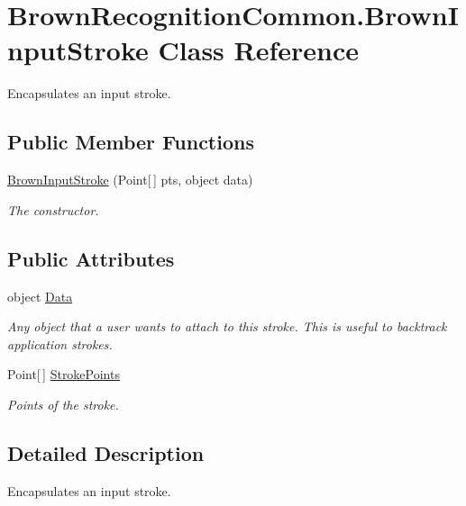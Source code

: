 \hypertarget{class_brown_recognition_common_1_1_brown_input_stroke}{
\section{\-Brown\-Recognition\-Common.\-Brown\-Input\-Stroke \-Class \-Reference}
\label{class_brown_recognition_common_1_1_brown_input_stroke}
}


\-Encapsulates an input stroke.  


\subsection*{\-Public \-Member \-Functions}
\begin{DoxyCompactItemize}
\item 
\hyperlink{class_brown_recognition_common_1_1_brown_input_stroke_a221e0be107180f9c60a256cd982b5126}{\-Brown\-Input\-Stroke} (\-Point\mbox{[}$\,$\mbox{]} pts, object data)
\begin{DoxyCompactList}\small\item\em \-The constructor. \end{DoxyCompactList}\end{DoxyCompactItemize}
\subsection*{\-Public \-Attributes}
\begin{DoxyCompactItemize}
\item 
object \hyperlink{class_brown_recognition_common_1_1_brown_input_stroke_ab7a2d9fb43b1e719127b04866a550777}{\-Data}
\begin{DoxyCompactList}\small\item\em \-Any object that a user wants to attach to this stroke. \-This is useful to backtrack application strokes. \end{DoxyCompactList}\item 
\-Point\mbox{[}$\,$\mbox{]} \hyperlink{class_brown_recognition_common_1_1_brown_input_stroke_a538b5a9e1d537247888ba5475974fb9e}{\-Stroke\-Points}
\begin{DoxyCompactList}\small\item\em \-Points of the stroke. \end{DoxyCompactList}\end{DoxyCompactItemize}


\subsection{\-Detailed \-Description}
\-Encapsulates an input stroke. 



